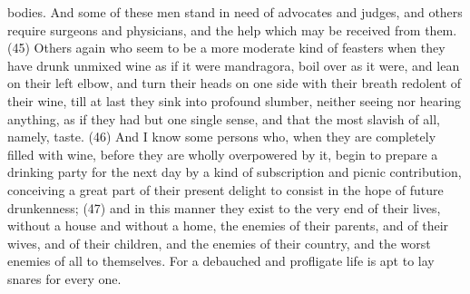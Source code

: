 bodies. And some of these men stand in need of advocates and judges, and others require
surgeons and physicians, and the help which may be received from them. (45) Others again who
seem to be a more moderate kind of feasters when they have drunk unmixed wine as if it were
mandragora, boil over as it were, and lean on their left elbow, and turn their heads on one side with
their breath redolent of their wine, till at last they sink into profound slumber, neither seeing nor
hearing anything, as if they had but one single sense, and that the most slavish of all, namely,
taste. (46) And I know some persons who, when they are completely filled with wine, before they
are wholly overpowered by it, begin to prepare a drinking party for the next day by a kind of
subscription and picnic contribution, conceiving a great part of their present delight to consist in the
hope of future drunkenness; (47) and in this manner they exist to the very end of their lives, without
a house and without a home, the enemies of their parents, and of their wives, and of their children,
and the enemies of their country, and the worst enemies of all to themselves. For a debauched and
profligate life is apt to lay snares for every one.

